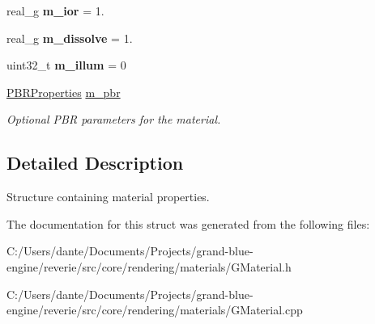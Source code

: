 \begin{DoxyCompactItemize}
\mbox{\label{structrev_1_1_material_properties_ab3daf4fafac466c7eac37b398dc5542d}} 
real\+\_\+g {\bfseries m\+\_\+ior} = 1.
\item 
\mbox{\label{structrev_1_1_material_properties_a61645a89fd3799117cddf3b8fd39aaf4}} 
real\+\_\+g {\bfseries m\+\_\+dissolve} = 1.
\item 
\mbox{\label{structrev_1_1_material_properties_aa8639cc0ac409edb465875ff7ab904c9}} 
uint32\+\_\+t {\bfseries m\+\_\+illum} = 0
\item 
\mbox{\label{structrev_1_1_material_properties_a9506c8e08ce17c6893bb71fc2c867046}} 
\mbox{\hyperlink{structrev_1_1_p_b_r_properties}{P\+B\+R\+Properties}} \mbox{\hyperlink{structrev_1_1_material_properties_a9506c8e08ce17c6893bb71fc2c867046}{m\+\_\+pbr}}
\begin{DoxyCompactList}\small\item\em Optional P\+BR parameters for the material. \end{DoxyCompactList}\end{DoxyCompactItemize}


\subsection{Detailed Description}
Structure containing material properties. 

The documentation for this struct was generated from the following files\+:\begin{DoxyCompactItemize}
\item 
C\+:/\+Users/dante/\+Documents/\+Projects/grand-\/blue-\/engine/reverie/src/core/rendering/materials/G\+Material.\+h\item 
C\+:/\+Users/dante/\+Documents/\+Projects/grand-\/blue-\/engine/reverie/src/core/rendering/materials/G\+Material.\+cpp\end{DoxyCompactItemize}
